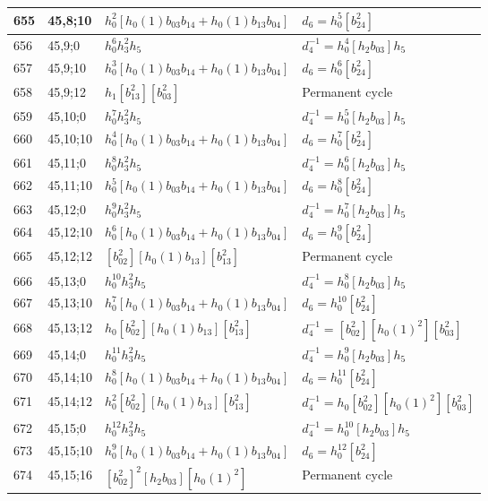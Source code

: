 \documentclass{article}
\begin{document}
\begin{longtable}{|l|l|>{\raggedright\arraybackslash}p{6cm}|>{\raggedright\arraybackslash}p{6cm}|}
\hline
655 & 45,8;10 & $h_0^2[h_0(1)b_{03}b_{14} + h_0(1)b_{13}b_{04}]$ &$d_{6}=h_0^5[b_{24}^2]$\\
\hline
656 & 45,9;0 & $h_0^6h_3^2h_5$ & $d_{4}^{-1}=h_0^4[h_2b_{03}]h_5$\\
\hline
657 & 45,9;10 & $h_0^3[h_0(1)b_{03}b_{14} + h_0(1)b_{13}b_{04}]$ &$d_{6}=h_0^6[b_{24}^2]$\\
\hline
658 & 45,9;12 & $h_1[b_{13}^2][b_{03}^2]$ & Permanent cycle\\
\hline
659 & 45,10;0 & $h_0^7h_3^2h_5$ & $d_{4}^{-1}=h_0^5[h_2b_{03}]h_5$\\
\hline
660 & 45,10;10 & $h_0^4[h_0(1)b_{03}b_{14} + h_0(1)b_{13}b_{04}]$ &$d_{6}=h_0^7[b_{24}^2]$\\
\hline
661 & 45,11;0 & $h_0^8h_3^2h_5$ & $d_{4}^{-1}=h_0^6[h_2b_{03}]h_5$\\
\hline
662 & 45,11;10 & $h_0^5[h_0(1)b_{03}b_{14} + h_0(1)b_{13}b_{04}]$ &$d_{6}=h_0^8[b_{24}^2]$\\
\hline
663 & 45,12;0 & $h_0^9h_3^2h_5$ & $d_{4}^{-1}=h_0^7[h_2b_{03}]h_5$\\
\hline
664 & 45,12;10 & $h_0^6[h_0(1)b_{03}b_{14} + h_0(1)b_{13}b_{04}]$ &$d_{6}=h_0^9[b_{24}^2]$\\
\hline
665 & 45,12;12 & $[b_{02}^2][h_0(1)b_{13}][b_{13}^2]$ & Permanent cycle\\
\hline
666 & 45,13;0 & $h_0^{10}h_3^2h_5$ & $d_{4}^{-1}=h_0^8[h_2b_{03}]h_5$\\
\hline
667 & 45,13;10 & $h_0^7[h_0(1)b_{03}b_{14} + h_0(1)b_{13}b_{04}]$ &$d_{6}=h_0^{10}[b_{24}^2]$\\
\hline
668 & 45,13;12 & $h_0[b_{02}^2][h_0(1)b_{13}][b_{13}^2]$ & $d_{4}^{-1}=[b_{02}^2][h_0(1)^2][b_{03}^2]$\\
\hline
669 & 45,14;0 & $h_0^{11}h_3^2h_5$ & $d_{4}^{-1}=h_0^9[h_2b_{03}]h_5$\\
\hline
670 & 45,14;10 & $h_0^8[h_0(1)b_{03}b_{14} + h_0(1)b_{13}b_{04}]$ &$d_{6}=h_0^{11}[b_{24}^2]$\\
\hline
671 & 45,14;12 & $h_0^2[b_{02}^2][h_0(1)b_{13}][b_{13}^2]$ & $d_{4}^{-1}=h_0[b_{02}^2][h_0(1)^2][b_{03}^2]$\\
\hline
672 & 45,15;0 & $h_0^{12}h_3^2h_5$ & $d_{4}^{-1}=h_0^{10}[h_2b_{03}]h_5$\\
\hline
673 & 45,15;10 & $h_0^9[h_0(1)b_{03}b_{14} + h_0(1)b_{13}b_{04}]$ &$d_{6}=h_0^{12}[b_{24}^2]$\\
\hline
674 & 45,15;16 & $[b_{02}^2]^2[h_2b_{03}][h_0(1)^2]$ & Permanent cycle\\

\end{longtable}
\end{document}
